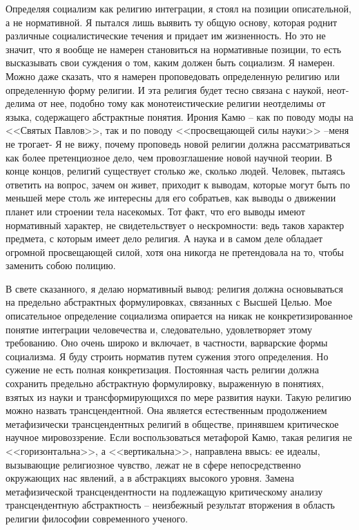 \documentclass{book}
\begin{document}
Определяя социализм как религию интеграции, я стоял на позиции описательной, а не нормативной. Я пытался лишь выя­вить ту общую основу, которая роднит различные социалисти­ческие течения и придает им жизненность. Но это не значит, что я вообще не намерен становиться на нормативные позиции, то есть высказывать свои суждения о том, каким должен быть социализм. Я намерен. Можно даже сказать, что я намерен проповедовать определенную религию или определенную фор­му религии. И эта религия будет тесно связана с наукой, неот­делима от нее, подобно тому как монотеистические религии неотделимы от языка, содержащего абстрактные понятия. Ирония Камю -- как по поводу моды на <<Святых Павлов>>, так и по поводу <<просвещающей силы науки>> --меня не тро­гает- Я не вижу, почему проповедь новой религии должна рас­сматриваться как более претенциозное дело, чем провозглаше­ние новой научной теории. В конце концов, религий существу­ет столько же, сколько людей. Человек, пытаясь ответить на вопрос, зачем он живет, приходит к 
выводам, которые могут быть по меньшей мере столь же интересны для его собратьев, как выводы о движении планет или строении тела насекомых. Тот факт, что его выводы имеют нормативный характер, не сви­детельствует о нескромности: ведь таков характер предмета, с которым имеет дело религия. А наука и в самом деле обла­дает огромной просвещающей силой, хотя она никогда не пре­тендовала на то, чтобы заменить собою полицию.

В свете сказанного, я делаю нормативный вывод: религия должна основываться на предельно абстрактных формулиров­ках, связанных с Высшей Целью. Мое описательное определе­ние социализма опирается на никак не конкретизированное понятие интеграции человечества и, следовательно, удовлетво­ряет этому требованию. Оно очень широко и включает, в частности, варварские формы социализма. Я буду строить норматив путем сужения этого определения. Но сужение не есть полная конкретизация. Постоянная часть религии должна сохранить предельно абстрактную формулировку, выраженную в понятиях, взятых из науки и трансформирующихся по мере развития науки. Такую религию можно назвать трансцендентной. Она является естественным продолжением метафизически трансцендентных религий в обществе, принявшем критическое научное мировоззрение. Если воспользоваться метафорой Камю, такая религия не <<горизонтальна>>, а <<вертикальна>>, направле­на ввысь: ее идеалы, вызывающие религиозное чувство, лежат не в сфере непосредственно окружающих нас 
явлений, 
а в абстракциях высокого уровня. Замена метафизической транс­цендентности на подлежащую критическому анализу трансцендентную абстрактность -- неизбежный результат вторжения в область религии философии современного ученого.
\end{document}
